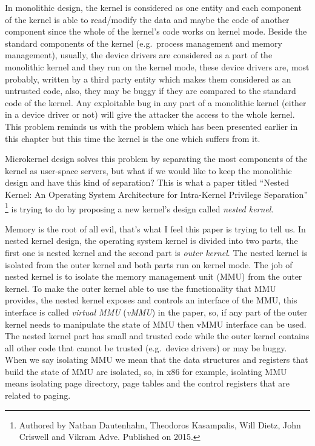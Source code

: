 In monolithic design, the kernel is considered as one entity and each
component of the kernel is able to read/modify the data and maybe the
code of another component since the whole of the kernel's code works on
kernel mode. Beside the standard components of the kernel (e.g.~process
management and memory management), usually, the device drivers are
considered as a part of the monolithic kernel and they run on the kernel
mode, these device drivers are, most probably, written by a third party
entity which makes them considered as an untrusted code, also, they may
be buggy if they are compared to the standard code of the kernel. Any
exploitable bug in any part of a monolithic kernel (either in a device
driver or not) will give the attacker the access to the whole kernel.
This problem reminds us with the problem which has been presented
earlier in this chapter but this time the kernel is the one which
suffers from it.

Microkernel design solves this problem by separating the most components
of the kernel as user-space servers, but what if we would like to keep
the monolithic design and have this kind of separation? This is what a
paper titled ``Nested Kernel: An Operating System Architecture for
Intra-Kernel Privilege Separation'' \footnote{Authored by Nathan
  Dautenhahn, Theodoros Kasampalis, Will Dietz, John Criswell and Vikram
  Adve. Published on 2015.} is trying to do by proposing a new kernel's
design called \emph{nested kernel}.

Memory is the root of all evil, that's what I feel this paper is trying
to tell us. In nested kernel design, the operating system kernel is
divided into two parts, the first one is nested kernel and the second
part is \emph{outer kernel}. The nested kernel is isolated from the
outer kernel and both parts run on kernel mode. The job of nested kernel
is to isolate the memory management unit (MMU) from the outer kernel. To
make the outer kernel able to use the functionality that MMU provides,
the nested kernel exposes and controls an interface of the MMU, this
interface is called \emph{virtual MMU} (\emph{vMMU}) in the paper, so,
if any part of the outer kernel needs to manipulate the state of MMU
then vMMU interface can be used. The nested kernel part has small and
trusted code while the outer kernel contains all other code that cannot
be trusted (e.g.~device drivers) or may be buggy. When we say isolating
MMU we mean that the data structures and registers that build the state
of MMU are isolated, so, in x86 for example, isolating MMU means
isolating page directory, page tables and the control registers that are
related to paging.

